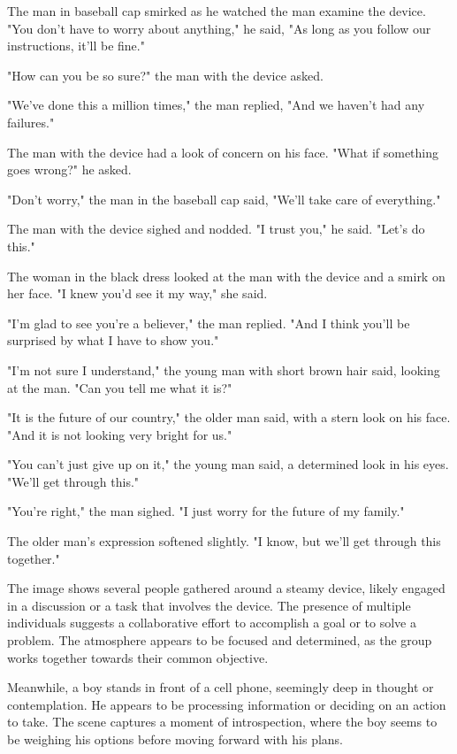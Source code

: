 \documentclass[smalldemyvopaper,11pt,twoside,onecolumn,openright,extrafontsizes]{memoir}
\begin{document}
The man in baseball cap smirked as he watched the man examine the device. "You don't have to worry about anything," he said, "As long as you follow our instructions, it'll be fine."\par
"How can you be so sure?" the man with the device asked.\par
"We've done this a million times," the man replied, "And we haven't had any failures."\par
The man with the device had a look of concern on his face. "What if something goes wrong?" he asked.\par
"Don't worry," the man in the baseball cap said, "We'll take care of everything."\par
The man with the device sighed and nodded. "I trust you," he said. "Let's do this."\par
The woman in the black dress looked at the man with the device and a smirk on her face. "I knew you'd see it my way," she said.\par
"I'm glad to see you're a believer," the man replied. "And I think you'll be surprised by what I have to show you."\par
"I'm not sure I understand," the young man with short brown hair said, looking at the man. "Can you tell me what it is?"\par
"It is the future of our country," the older man said, with a stern look on his face. "And it is not looking very bright for us."\par
"You can't just give up on it," the young man said, a determined look in his eyes. "We'll get through this."\par
"You're right," the man sighed. "I just worry for the future of my family."\par
The older man's expression softened slightly. "I know, but we'll get through this together."\par
The image shows several people gathered around a steamy device, likely engaged in a discussion or a task that involves the device. The presence of multiple individuals suggests a collaborative effort to accomplish a goal or to solve a problem. The atmosphere appears to be focused and determined, as the group works together towards their common objective.\par
Meanwhile, a boy stands in front of a cell phone, seemingly deep in thought or contemplation. He appears to be processing information or deciding on an action to take. The scene captures a moment of introspection, where the boy seems to be weighing his options before moving forward with his plans.\par
\end{document}
